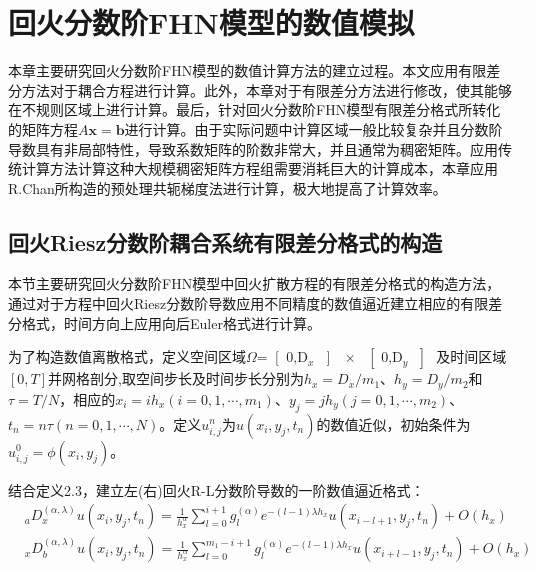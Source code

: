 \documentclass[twoside,UTF8]{nputhesis}
\begin{document}
\chapter{回火分数阶FHN模型的数值模拟}
本章主要研究回火分数阶FHN模型的数值计算方法的建立过程。本文应用有限差分方法对于耦合方程进行计算。此外，本章对于有限差分方法进行修改，使其能够在不规则区域上进行计算。最后，针对回火分数阶FHN模型有限差分格式所转化的矩阵方程$A\bm{x}=\bm{b}$进行计算。由于实际问题中计算区域一般比较复杂并且分数阶导数具有非局部特性，导致系数矩阵的阶数非常大，并且通常为稠密矩阵。应用传统计算方法计算这种大规模稠密矩阵方程组需要消耗巨大的计算成本，本章应用R.Chan所构造的预处理共轭梯度法进行计算，极大地提高了计算效率。

\section{回火Riesz分数阶耦合系统有限差分格式的构造}
本节主要研究回火分数阶FHN模型中回火扩散方程的有限差分格式的构造方法，通过对于方程中回火Riesz分数阶导数应用不同精度的数值逼近建立相应的有限差分格式，时间方向上应用向后Euler格式进行计算。

为了构造数值离散格式，定义空间区域$\Omega \text{= }\!\![\!\!\text{ 0,}{{\text{D}}_{x}}\text{ }\!\!]\!\!\text{ }\times \text{ }\!\![\!\!\text{ 0,}{{\text{D}}_{y}}\text{ }\!\!]\!\!\text{ }$及时间区域$[0,T]$并网格剖分,取空间步长及时间步长分别为${{h}_{x}}={{D}_{x}}/{{m}_{1}}$、${{h}_{y}}={{D}_{y}}/{{m}_{2}}$和$\tau =T/N$，相应的${{x}_{i}}=i{{h}_{x}}(i=0,1,\cdots ,{{m}_{1}})$、${{y}_{j}}=j{{h}_{y}}(j=0,1,\cdots ,{{m}_{2}})$、${{t}_{n}}=n\tau(n=0,1,\cdots ,N)$。定义$u_{i,j}^{n}$为$u({{x}_{i}},{{y}_{j}},{{t}_{n}})$的数值近似，初始条件为$u_{i,j}^{0}=\phi ({{x}_{i}},{{y}_{j}})$。

结合定义2.3，建立左(右)回火R-L分数阶导数的一阶数值逼近格式：
\begin{equation}
\begin{split}
&{}_{a}D_{x}^{(\alpha ,\lambda )}u({{x}_{i}},{{y}_{j}},{{t}_{n}})=\frac{1}{{{h}_{x}^{\alpha }}}\sum\limits_{l=0}^{i+1}{g_{l}^{(\alpha )}}{{e}^{-(l-1)\lambda {h}_{x}}}u({{x}_{i-l+1}},{{y}_{j}},{{t}_{n}})+O({h}_{x})
\end{split}
\end{equation}
\begin{equation}
\begin{split}
&{}_{x}D_{b}^{(\alpha ,\lambda )}u({{x}_{i}},{{y}_{j}},{{t}_{n}})=\frac{1}{{{h}_{x}^{\alpha }}}\sum\limits_{l=0}^{{{m}_{1}}-i+1}{g_{l}^{(\alpha )}}
{{e}^{-(l-1)\lambda {h}_{x}}}u({{x}_{i+l-1}},{{y}_{j}},{{t}_{n}})+O({h}_{x})
\end{split}
\end{equation}
\end{document}
